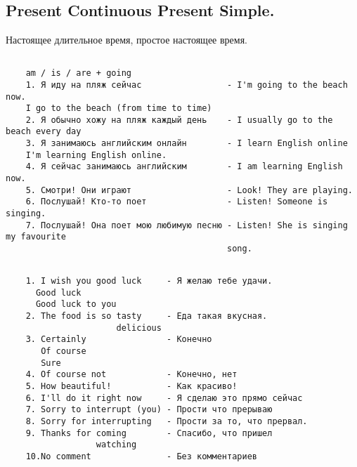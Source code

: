 \subsection{Present Continuous Present Simple.}
Настоящее длительное время, простое настоящее время.
\subsection*{}
\begin{verbatim}
    am / is / are + going
    1. Я иду на пляж сейчас                 - I'm going to the beach now.
    I go to the beach (from time to time)
    2. Я обычно хожу на пляж каждый день    - I usually go to the beach every day
    3. Я занимаюсь английским онлайн        - I learn English online
    I'm learning English online.
    4. Я сейчас занимаюсь английским        - I am learning English now.
    5. Смотри! Они играют                   - Look! They are playing.
    6. Послушай! Кто-то поет                - Listen! Someone is singing.
    7. Послушай! Она поет мою любимую песню - Listen! She is singing my favourite
                                            song.
\end{verbatim}

\subsection*{}
\begin{verbatim}
    1. I wish you good luck     - Я желаю тебе удачи.
      Good luck
      Good luck to you
    2. The food is so tasty     - Еда такая вкусная.
                      delicious
    3. Certainly                - Конечно
       Of course
       Sure
    4. Of course not            - Конечно, нет
    5. How beautiful!           - Как красиво!
    6. I'll do it right now     - Я сделаю это прямо сейчас
    7. Sorry to interrupt (you) - Прости что прерываю
    8. Sorry for interrupting   - Прости за то, что прервал.
    9. Thanks for coming        - Спасибо, что пришел
                  watching
    10.No comment               - Без комментариев
\end{verbatim}

